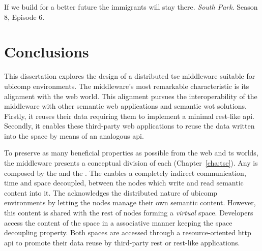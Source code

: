 
\begin{savequote}[50mm]
If we build for a better future the immigrants will stay there.
\emph{South Park}. Season 8, Episode 6.
\end{savequote}


\chapter{Conclusions}
\label{cha:conclusions}


\ifpdf
    \graphicspath{{\pathchapseven/figures/PNG/}{\pathchapseven/figures/PDF/}{\pathchapseven/figures/}}
\else
    \graphicspath{{\pathchapseven/figures/EPS/}{\pathchapseven/figures/}}
\fi




This dissertation explores the design of a distributed \ac{tsc} middleware suitable for \ac{ubicomp} environments.
The middleware's most remarkable characteristic is its alignment with the web world.
This alignment pursues the interoperability of the middleware with other semantic web applications and semantic \ac{wot} solutions.
Firstly, it reuses their data requiring them to implement a minimal \ac{rest}-like \ac{api}.
Secondly, it enables these third-party web applications to reuse the data written into the space by means of an analogous \ac{api}. %


To preserve as many beneficial properties as possible from the web and \ac{ts} worlds, the middleware presents a conceptual division of each \Space{} (Chapter~\ref{cha:tsc}).
Any \Space{} is composed by the \coordspace{} and the \outerspace{}.
The \coordspace{} enables a completely indirect communication, time and space decoupled, between the nodes which write and read semantic content into it.
The \outerspace{} acknowledges the distributed nature of \ac{ubicomp} environments by letting the nodes manage their own semantic content.
However, this content is shared with the rest of nodes forming a \emph{virtual} space.
Developers access the content of the space in a associative manner keeping the space decoupling property.
Both spaces are accessed through a resource-oriented \ac{http} \ac{api} to promote their data reuse by third-party \ac{rest} or \ac{rest}-like applications.


